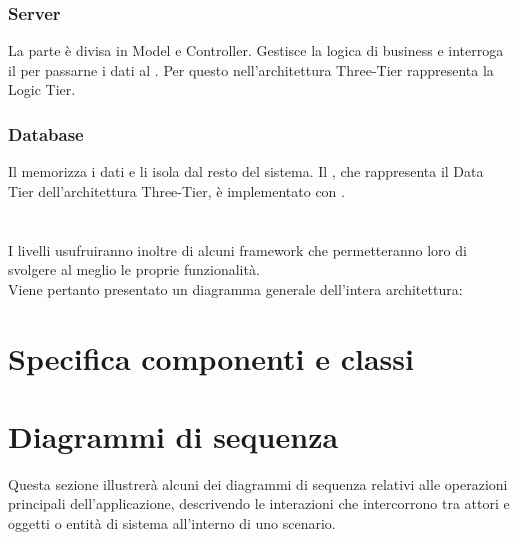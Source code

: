 \documentclass[a4paper, titlepage]{article}
\begin{document}
	\subsubsection{Server}
	La parte  è divisa in Model e Controller. Gestisce la logica di business e interroga il  per passarne i dati al . Per questo nell'architettura Three-Tier rappresenta la Logic Tier.
	
	\subsubsection{Database}
	Il  memorizza i dati e li isola dal resto del sistema. Il , che rappresenta il Data Tier dell'architettura Three-Tier, è implementato con .
	\\ \\ \\I livelli usufruiranno inoltre di alcuni framework che permetteranno loro di svolgere al meglio le proprie funzionalità.
	\\Viene pertanto presentato un diagramma generale dell'intera architettura:


\newpage
\section{Specifica componenti e classi}


\newpage
\section{Diagrammi di sequenza}
Questa sezione illustrerà alcuni dei diagrammi di sequenza relativi alle operazioni principali
dell'applicazione, descrivendo le interazioni che intercorrono tra attori e oggetti o entità di
sistema all'interno di uno scenario.
\end{document}
